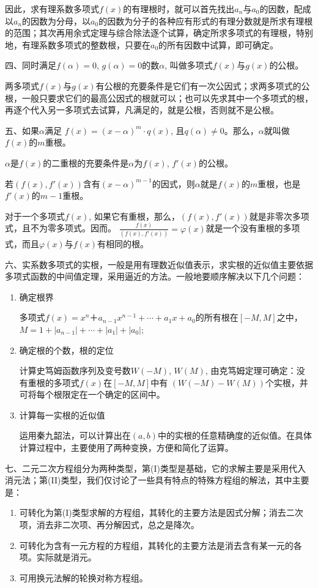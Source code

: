 因此，求有理系数多项式$f(x)$的有理根时，就可以首先找出$a_n$与$a_0$的因数，配成以$a_n$的因数为分母，以$a_0$的因数为分子的各种应有形式的有理分数就是所求有理根的范围；其次再用余式定理与综合除法逐个试算，确定所求多项式的有理根，特别地，有理系数多项式的整数根，只要在$a_0$的所有因数中试算，即可确定。

四、同时满足$f(\alpha)=0$, $g(\alpha)=0$的数$\alpha$, 叫做多项式$f(x)$与$g(x)$的公根。

两多项式$f(x)$与$g(x)$有公根的充要条件是它们有一次公因式；求两多项式的公根，一般只要求它们的最高公因式的根就可以；也可以先求其中一个多项式的根，再逐个代入另一多项式去试算，凡满足的，就是公根，否则就不是公根。

五、如果$\alpha$满足
$f(x)=(x-\alpha)^m\cdot q(x)$, 且$q(\alpha)\ne 0$。那么，$\alpha$就叫做$f(x)$的$m$重根。

$\alpha$是$f(x)$的二重根的充要条件是$\alpha$为$f(x)$, $f'(x)$的公根。

若$(f(x),f'(x))$含有$(x-\alpha)^{m-1}$的因式，则$\alpha$就是$f(x)$的$m$重根，也是$f'(x)$的$m-1$重根。

对于一个多项式$f(x)$, 如果它有重根，那么，$(f(x),f'(x))$就是非零次多项式，且不为零多项式。因而。
$\frac{f (x)}{(f (x) ,f' (x) )}=\varphi(x)$就是一个没有重根的多项式，而且$\varphi(x)$与$f(x)$有相同的根。

六、实系数多项式的实根，一般是用有理数近似值表示，求实根的近似值主要依据多项式函数的中间值定理，采用逼近的方法。一般地要顺序解决以下几个问题：
\begin{enumerate}
    \item 确定根界
    
    多项式$f(x)=x^n＋a_{n-1}x^{n-1}+\cdots+a_1x+a_0$的所有根在$[-M,M]$之中，$M=1+|a_{n-1}|+\cdots+|a_1|+|a_0|$;
    
    \item 确定根的个数，根的定位
    
    计算史笃姆函数序列及变号数$W(-M)$, $W(M)$, 由克笃姆定理可确定：没有重根的多项式$f(x)$在$[-M,M]$中有
    $(W(-M)-W(M))$个实根，并可将每个根限定在一个确定的区间中。
    \item 计算每一实根的近似值
    
    运用秦九韶法，可以计算出在$(a,b)$中的实根的任意精确度的近似值。在具体计算过程中，主要使用了两种变换，方便和简化了运算。
 \end{enumerate}

    七、二元二次方程组分为两种类型，第(I)类型是基础，它的求解主要是采用代入消元法；第(II)类型，我们仅讨论了一些具有特点的特殊方程组的解法，其中主要是：
    \begin{enumerate}
        \item 可转化为第(I)类型求解的方程组，其转化的主要方法是因式分解；消去二次项，消去非二次项、再分解因式，总之是降次。
        \item 可转化为含有一元方程的方程组，其转化的主要方法是消去含有某一元的各项。实际就是消元。
        \item 可用换元法解的轮换对称方程组。
\end{enumerate}

